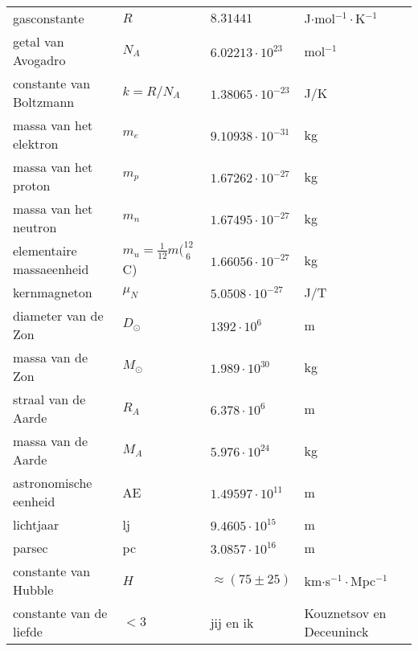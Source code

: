 \documentclass[dutch]{article}
\begin{document}
{\begin{tabular}{ l | l l l l}
        gasconstante & $R$ & $8.31441$ &J$\cdot$mol$^{-1}\cdot$K$^{-1}$ & \\
        getal van Avogadro & $N_{A}$ & $6.02213\cdot10^{23}$&mol$^{-1}$ & \\
        constante van Boltzmann & $k=R/N_{A}$ & $1.38065\cdot10^{-23}$ & J/K & \\
        \hline
        massa van het elektron & $m_{
            e}$ & $9.10938\cdot10^{-31}$ & kg & \\
        massa van het proton & $m_{p}$ & $1.67262\cdot10^{-27}$ & kg & \\
        massa van het neutron & $m_{n}$ & $1.67495\cdot10^{-27}$ & kg & \\
        elementaire massaeenheid & $m_{
            u}=\frac{1}{12}m(^{12}_{~6}$C)&$1.66056\cdot10^{-27}$ & kg & \\
        kernmagneton & $\mu_{N}$ & $5.0508\cdot10^{-27}$ & J/T\\
        \hline
        diameter van de Zon & $D_\odot$ & $1392\cdot10^6$ & m & \\
        massa van de Zon & $M_\odot$ & $1.989\cdot10^{30}$ & kg & \\
        straal van de Aarde & $R_{A}$ & $6.378\cdot10^6$ & m & \\
        massa van de Aarde & $M_{A}$ & $5.976\cdot10^{24}$ & kg & \\
        astronomische eenheid & AE & $1.49597\cdot10^{11}$ & m & \\
        lichtjaar & lj & $9.4605\cdot10^{15}$ & m & \\
        parsec & pc & $3.0857\cdot10^{16}$ & m & \\
        constante van Hubble & $H$ & $\approx(75\pm25)$ & km$\cdot$s$^{-1}\cdot$Mpc$^{-1}$
        & \\
        constante van de liefde & $<3$ & jij en ik & Kouznetsov en Deceuninck & \\
        \hline
    \end{tabular}
}
\end{document}
